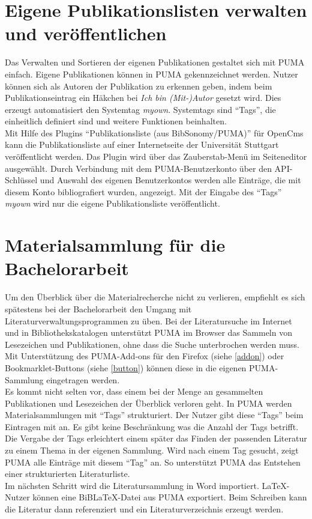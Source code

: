 \section{Eigene Publikationslisten verwalten und veröffentlichen}
\label{sec:eigenePublistenVerwalten}
Das Verwalten und Sortieren der eigenen Publikationen gestaltet sich mit PUMA einfach. Eigene  Publikationen können in PUMA gekennzeichnet werden. Nutzer können sich als Autoren der Publikation zu erkennen geben, indem beim Publikationseintrag ein Häkchen bei \textit{Ich bin (Mit-)Autor} gesetzt wird. Dies erzeugt automatisiert den Systemtag \textit{myown}. Systemtags sind \enquote{Tags}, die einheitlich definiert sind und weitere Funktionen beinhalten.\\
Mit Hilfe des Plugins \enquote{Publikationsliste (aus BibSonomy/PUMA)} für OpenCms kann die Publikationsliste auf einer Internetseite der Universität Stuttgart veröffentlicht werden. Das Plugin wird über das Zauberstab-Menü im Seiteneditor ausgewählt. Durch Verbindung mit dem PUMA-Benutzerkonto über den API-Schlüssel und Auswahl des eigenen Benutzerkontos werden alle Einträge, die mit diesem Konto bibliografiert wurden, angezeigt. Mit der Eingabe des \enquote{Tags} \textit{myown} wird nur die eigene Publikationsliste veröffentlicht.



\section{Materialsammlung für die Bachelorarbeit}
\label{sec:materialsammlungBachelorarbeit}
Um den Überblick über die Materialrecherche nicht zu verlieren, empfiehlt es sich spätestens bei der Bachelorarbeit den Umgang mit Literaturverwaltungsprogrammen zu üben. Bei der Literatursuche im Internet und in Bibliothekskatalogen unterstützt PUMA im Browser das Sammeln von Lesezeichen und Publikationen, ohne dass die Suche unterbrochen werden muss. Mit Unterstützung des PUMA-Add-ons für den Firefox (siehe \autoref{addon}) oder Bookmarklet-Buttons (siehe \autoref{button}) können diese in die eigenen PUMA-Sammlung eingetragen werden.\\
Es kommt nicht selten vor, dass einem bei der Menge an gesammelten Publikationen und Lesezeichen der Überblick verloren geht. In PUMA werden Materialsammlungen mit \enquote{Tags} strukturiert. Der Nutzer gibt diese \enquote{Tags} beim Eintragen mit an. Es gibt keine Beschränkung was die Anzahl der Tags betrifft. Die Vergabe der Tags erleichtert einem später das Finden der passenden Literatur zu einem Thema in der eigenen Sammlung. Wird nach einem Tag gesucht, zeigt PUMA alle Einträge mit diesem \enquote{Tag} an. So unterstützt PUMA das Entstehen einer strukturierten Literaturliste.\\
Im nächsten Schritt wird die Literatursammlung in Word importiert. LaTeX-Nutzer können eine BiBLaTeX-Datei aus PUMA exportiert. Beim Schreiben kann die Literatur dann referenziert und ein Literaturverzeichnis erzeugt werden.

